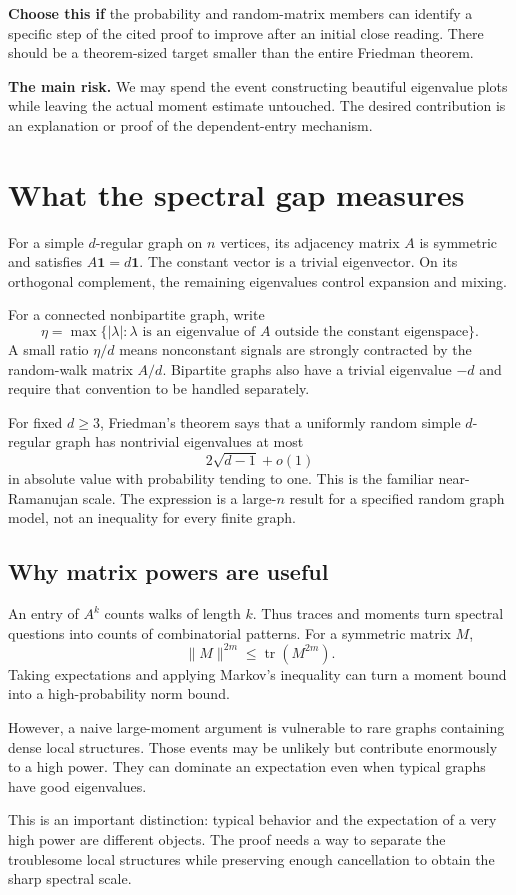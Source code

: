 \documentclass[11pt,letterpaper]{article}
\newcommand{\Page}[1]{\clearpage\section*{#1}}
\newcommand{\Sub}[1]{\subsection*{#1}}
\begin{document}
\textbf{Choose this if} the probability and random-matrix members can identify a specific step of the cited proof to improve after an initial close reading. There should be a theorem-sized target smaller than the entire Friedman theorem.

\textbf{The main risk.} We may spend the event constructing beautiful eigenvalue plots while leaving the actual moment estimate untouched. The desired contribution is an explanation or proof of the dependent-entry mechanism.

\Page{What the spectral gap measures}
For a simple $d$-regular graph on $n$ vertices, its adjacency matrix $A$ is symmetric and satisfies $A\mathbf1=d\mathbf1$. The constant vector is a trivial eigenvector. On its orthogonal complement, the remaining eigenvalues control expansion and mixing.

For a connected nonbipartite graph, write
\[
 \eta=\max\{|\lambda|:\lambda\text{ is an eigenvalue of }A
                 \text{ outside the constant eigenspace}\}.
\]
A small ratio $\eta/d$ means nonconstant signals are strongly contracted by the random-walk matrix $A/d$. Bipartite graphs also have a trivial eigenvalue $-d$ and require that convention to be handled separately.

For fixed $d\geq3$, Friedman's theorem says that a uniformly random simple $d$-regular graph has nontrivial eigenvalues at most
\[
 2\sqrt{d-1}+o(1)
\]
in absolute value with probability tending to one. This is the familiar near-Ramanujan scale. The expression is a large-$n$ result for a specified random graph model, not an inequality for every finite graph.

\Sub{Why matrix powers are useful}
An entry of $A^k$ counts walks of length $k$. Thus traces and moments turn spectral questions into counts of combinatorial patterns. For a symmetric matrix $M$,
\[
 \|M\|^{2m}\leq\operatorname{tr}(M^{2m}).
\]
Taking expectations and applying Markov's inequality can turn a moment bound into a high-probability norm bound.

However, a naive large-moment argument is vulnerable to rare graphs containing dense local structures. Those events may be unlikely but contribute enormously to a high power. They can dominate an expectation even when typical graphs have good eigenvalues.

This is an important distinction: typical behavior and the expectation of a very high power are different objects. The proof needs a way to separate the troublesome local structures while preserving enough cancellation to obtain the sharp spectral scale.
\end{document}
